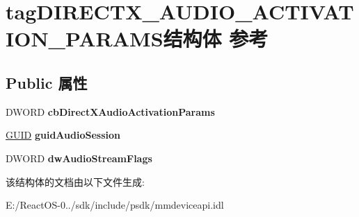 \hypertarget{structtag_d_i_r_e_c_t_x___a_u_d_i_o___a_c_t_i_v_a_t_i_o_n___p_a_r_a_m_s}{}\section{tag\+D\+I\+R\+E\+C\+T\+X\+\_\+\+A\+U\+D\+I\+O\+\_\+\+A\+C\+T\+I\+V\+A\+T\+I\+O\+N\+\_\+\+P\+A\+R\+A\+M\+S结构体 参考}
\label{structtag_d_i_r_e_c_t_x___a_u_d_i_o___a_c_t_i_v_a_t_i_o_n___p_a_r_a_m_s}
\subsection*{Public 属性}
\begin{DoxyCompactItemize}
\item 
\mbox{\label{structtag_d_i_r_e_c_t_x___a_u_d_i_o___a_c_t_i_v_a_t_i_o_n___p_a_r_a_m_s_acf9cdda0bbe80ffde3203f997f1446bc}} 
D\+W\+O\+RD {\bfseries cb\+Direct\+X\+Audio\+Activation\+Params}
\item 
\mbox{\label{structtag_d_i_r_e_c_t_x___a_u_d_i_o___a_c_t_i_v_a_t_i_o_n___p_a_r_a_m_s_a12516894fa6abccfb8f46b857868e5cf}} 
\hyperlink{interface_g_u_i_d}{G\+U\+ID} {\bfseries guid\+Audio\+Session}
\item 
\mbox{\label{structtag_d_i_r_e_c_t_x___a_u_d_i_o___a_c_t_i_v_a_t_i_o_n___p_a_r_a_m_s_a9b2fd0a5a43f9e1010da1c1e3640acdc}} 
D\+W\+O\+RD {\bfseries dw\+Audio\+Stream\+Flags}
\end{DoxyCompactItemize}


该结构体的文档由以下文件生成\+:\begin{DoxyCompactItemize}
\item 
E\+:/\+React\+O\+S-\/0../sdk/include/psdk/mmdeviceapi.\+idl\end{DoxyCompactItemize}
